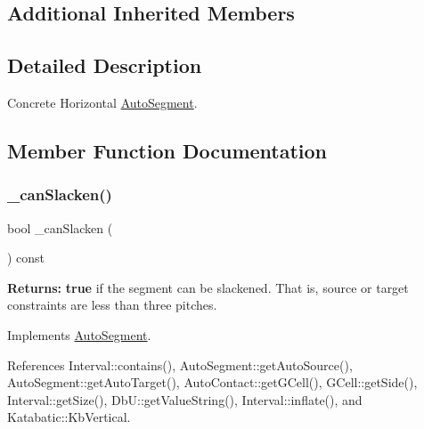 \subsection*{Additional Inherited Members}


\subsection{Detailed Description}
Concrete Horizontal \mbox{\hyperlink{classKatabatic_1_1AutoSegment}{Auto\+Segment}}. 

\subsection{Member Function Documentation}
\mbox{\label{classKatabatic_1_1AutoHorizontal_a2ced98fb06f208aa88c0962a706e64db}} 
\subsubsection{\texorpdfstring{\+\_\+can\+Slacken()}{\_canSlacken()}}
{\footnotesize\ttfamily bool \+\_\+can\+Slacken (\begin{DoxyParamCaption}{ }\end{DoxyParamCaption}) const\hspace{0.3cm}{\ttfamily [virtual]}}

{\bfseries Returns\+:} {\bfseries true} if the segment can be slackened. That is, source or target constraints are less than three pitches. 

Implements \mbox{\hyperlink{classKatabatic_1_1AutoSegment_a676fcb7ece71d129b7a4d87a3f2e07aa}{Auto\+Segment}}.



References Interval\+::contains(), Auto\+Segment\+::get\+Auto\+Source(), Auto\+Segment\+::get\+Auto\+Target(), Auto\+Contact\+::get\+G\+Cell(), G\+Cell\+::get\+Side(), Interval\+::get\+Size(), Db\+U\+::get\+Value\+String(), Interval\+::inflate(), and Katabatic\+::\+Kb\+Vertical.

\mbox{\label{classKatabatic_1_1AutoHorizontal_a9b0c21eeb26c256876592ba63438da74}} 
